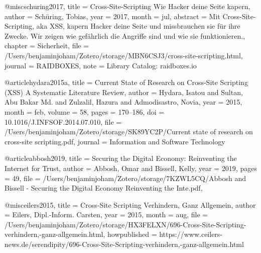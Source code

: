 @misc{schuring2017,
  title = {{Cross-Site-Scripting \textendash{} Wie Hacker deine Seite kapern}},
  author = {Sch{\"u}ring, Tobias},
  year = {2017},
  month = jul,
  abstract = {Mit Cross-Site-Scripting, aka XSS, kapern Hacker deine Seite und missbrauchen sie f{\"u}r ihre Zwecke. Wir zeigen wie gef{\"a}hrlich die Angriffe sind und wie sie funktionieren.},
  chapter = {Sicherheit},
  file = {/Users/benjaminjoham/Zotero/storage/MBN6CSJ3/cross-site-scripting.html},
  journal = {RAIDBOXES},
  note = {Library Catalog: raidboxes.io}
}



@article{hydara2015a,
  title = {Current State of Research on Cross-Site Scripting ({{XSS}}) \textendash{} {{A}} Systematic Literature Review},
  author = {Hydara, Isatou and Sultan, Abu Bakar Md. and Zulzalil, Hazura and Admodisastro, Novia},
  year = {2015},
  month = feb,
  volume = {58},
  pages = {170--186},
  doi = {10.1016/J.INFSOF.2014.07.010},
  file = {/Users/benjaminjoham/Zotero/storage/SK89YC2P/Current state of research on cross-site scripting.pdf},
  journal = {Information and Software Technology}
}

@article{abbosh2019,
  title = {Securing the {{Digital Economy}}: {{Reinventing}} the {{Internet}} for {{Trust}}},
  author = {Abbosh, Omar and Bissell, Kelly},
  year = {2019},
  pages = {49},
  file = {/Users/benjaminjoham/Zotero/storage/7KZWL5CQ/Abbosh and Bissell - Securing the Digital Economy Reinventing the Inte.pdf},
}

@misc{eilers2015,
  title = {Cross-{{Site Scripting}} Verhindern, Ganz Allgemein},
  author = {Eilers, Dipl.-Inform. Carsten},
  year = {2015},
  month = aug,
  file = {/Users/benjaminjoham/Zotero/storage/HX3FELXN/696-Cross-Site-Scripting-verhindern,-ganz-allgemein.html},
  howpublished = {https://www.ceilers-news.de/serendipity/696-Cross-Site-Scripting-verhindern,-ganz-allgemein.html}
}


